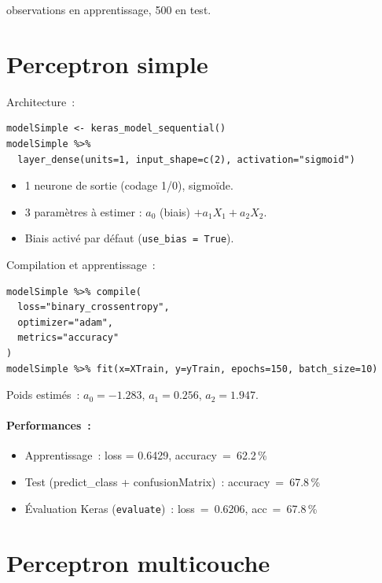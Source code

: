 \documentclass[a4paper,11pt]{article}
\begin{document}
 observations en apprentissage, 500 en test.

\section{Perceptron simple}

Architecture~:
\begin{lstlisting}
modelSimple <- keras_model_sequential()
modelSimple %>%
  layer_dense(units=1, input_shape=c(2), activation="sigmoid")
\end{lstlisting}

\begin{itemize}
  \item 1 neurone de sortie (codage 1/0), sigmo\"ide.
  \item 3 param\`etres \`a estimer : $a_0$ (biais) $+ a_1 X_1 + a_2 X_2$.
  \item Biais activ\'e par d\'efaut (\texttt{use\_bias = True}).
\end{itemize}

Compilation et apprentissage~:
\begin{lstlisting}
modelSimple %>% compile(
  loss="binary_crossentropy",
  optimizer="adam",
  metrics="accuracy"
)
modelSimple %>% fit(x=XTrain, y=yTrain, epochs=150, batch_size=10)
\end{lstlisting}

Poids estim\'es~: $a_0 = -1.283$, $a_1 = 0.256$, $a_2 = 1.947$.

\paragraph{Performances~:}
\begin{itemize}
  \item Apprentissage~: loss = 0.6429, accuracy~=~62.2\,\%
  \item Test (predict\_class + confusionMatrix)~: accuracy~=~67.8\,\%
  \item \'Evaluation Keras (\texttt{evaluate})~: loss~=~0.6206, acc~=~67.8\,\%
\end{itemize}

\section{Perceptron multicouche}
\end{document}
